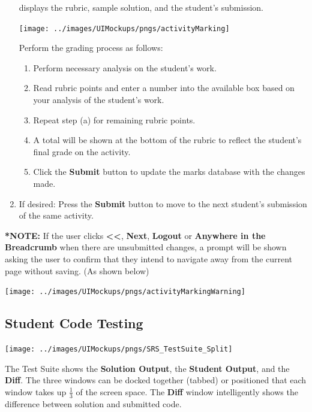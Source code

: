 \documentclass{article}
\begin{document}
\begin{enumerate}
    displays the rubric, sample solution, and the student's submission.
  \begin{center} 
   \texttt{[image: ../images/UIMockups/pngs/activityMarking]}
   \label{marking}
  \end{center}
    Perform the grading process as follows:
    \begin{enumerate}
      \item Perform necessary analysis on the student's work. 
      \item Read rubric points and enter a number into the available box 
        based on your analysis of the student's work.
      \item Repeat step (a) for remaining rubric points.
      \item A total will be shown at the bottom of the rubric to reflect the
        student's final grade on the activity.
       \item Click the \textbf{Submit} button to update the marks database with
         the changes made.
    \end{enumerate}

  \item If desired: Press the \textbf{Submit} button to move to the next
    student's submission of the same activity.
\end{enumerate}
\textbf{*NOTE: }If the user clicks \textbf{<<}, \textbf{Next}, \textbf{Logout}
or \textbf{Anywhere in the Breadcrumb} when there are unsubmitted changes, a
prompt will be shown asking the user to confirm that they intend to navigate away
from the current page without saving. (As shown below)

\begin{center}
  \texttt{[image: ../images/UIMockups/pngs/activityMarkingWarning]}
\end{center}

\subsection{Student Code Testing}
\begin{center}
\texttt{[image: ../images/UIMockups/pngs/SRS\_TestSuite\_Split]}
\label{testSuite}
\end{center}
The Test Suite shows the \textbf{Solution Output}, the \textbf{Student Output},
and the \textbf{Diff}.
The three windows can be docked together (tabbed) or positioned that each
window takes up $\frac{1}{3}$ of the screen space.
The \textbf{Diff} window intelligently shows the difference between
solution and submitted code.
\end{document}
